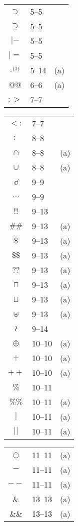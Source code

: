 \documentclass[fleqn,leqno]{article}
\newcommand{\notemark}[1]{$^{\mbox{\tiny(#1)}}$}
\begin{document}
{\begin{tabular}[t]{@{}cl@{\,}l}
$\supset$ & 5--5     & \\
$\supseteq$ & 5--5     & \\
$|-$ & 5--5     & \\
$|=$ & 5--5     & \\
$\cdot$\notemark{1} & 5--14  & \small(a) \\
$@@$ & 6--6      & \small(a) \\
$:>$ & 7--7 & \\
\end{tabular}
%
\begin{tabular}[t]{@{}cl@{\,}l}
$<:$ & 7--7 & \\
$:\:$ & 8--8        & \\
$\cap$ & 8--8       & \small(a) \\
$\cup$ & 8--8 & \small(a)  \\
$\dd$  & 9--9     & \\
$\dots$ & 9--9     & \\
$!!$ & 9--13      & \\
$\#\#$ & 9--13     & \small(a) \\
$\$$ & 9--13     & \small(a) \\
$\$\$$ & 9--13     & \small(a) \\
$??$ & 9--13     & \small(a) \\
$\sqcap$ & 9--13     & \small(a) \\
$\sqcup$ & 9--13     & \small(a) \\
$\uplus$ & 9--13     & \small(a) \\
$\wr$ & 9--14   & \\
$\oplus$ & 10--10   & \small(a)  \\
$+$ & 10--10      & \small(a) \\
$++$ & 10--10      & \small(a) \\
$\%$ & 10--11      & \\
$\%\%$ & 10--11     & \small(a) \\
$|$ & 10--11     & \small(a) \\
$||$ & 10--11     & \small(a) \\
\end{tabular}%
%
\begin{tabular}[t]{@{}cl@{\,}l}
$\ominus$ & 11--11  & \small(a)  \\
$-$ & 11--11     & \small(a) \\
$--$ & 11--11     & \small(a) \\
$\&$ & 13--13     & \small(a) \\
$\&\&$ & 13--13     & \small(a) \\

\end{tabular}}
\end{document}
